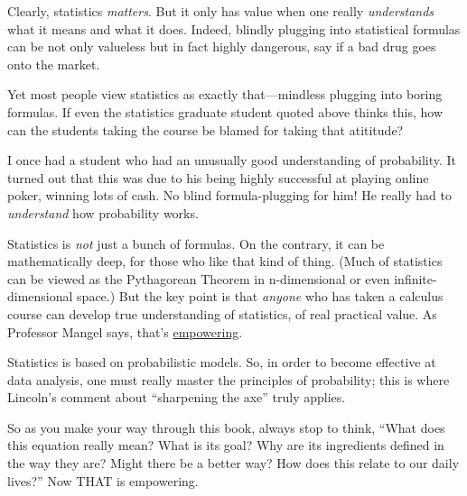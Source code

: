 Clearly, statistics {\it matters}.  But it only has value when one
really {\it understands} what it means and what it does.  Indeed,
blindly plugging into statistical formulas can be not only valueless but
in fact highly dangerous, say if a bad drug goes onto the market.

Yet most people view statistics as exactly that---mindless plugging into
boring formulas.  If even the statistics graduate student quoted above
thinks this, how can the students taking the course be blamed
for taking that atititude?

I once had a student who had an unusually good understanding of
probability.  It turned out that this was due to his being highly
successful at playing online poker, winning lots of cash.  No blind
formula-plugging for him!  He really had to {\it understand} how
probability works.  

Statistics is {\it not} just a bunch of formulas.  On the contrary, it
can be mathematically deep, for those who like that kind of thing.
(Much of statistics can be viewed as the Pythagorean Theorem in
n-dimensional or even infinite-dimensional space.)  But the key point is
that {\it anyone} who has taken a calculus course can develop true
understanding of statistics, of real practical value.  As Professor
Mangel says, that's \underline{empowering}.

Statistics is based on probabilistic models.  So, in order to become
effective at data analysis, one must really master the principles of
probability; this is where Lincoln's comment about ``sharpening the
axe'' truly applies.

So as you make your way through this book, always stop to think, ``What
does this equation really mean?  What is its goal?  Why are its
ingredients defined in the way they are?  Might there be a better way?
How does this relate to our daily lives?''  Now THAT is empowering.

